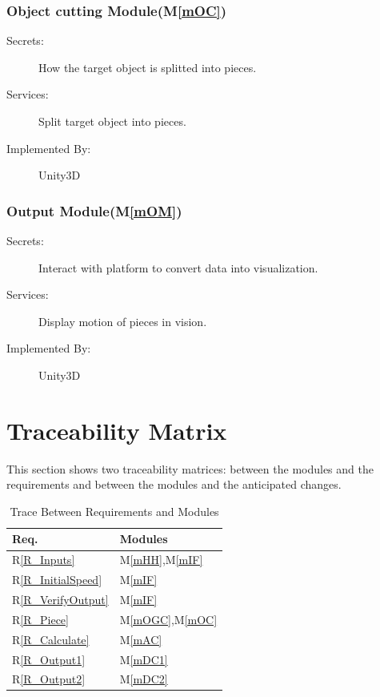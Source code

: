 \documentclass[12pt, titlepage]{article}
\newcommand{\rref}[1]{R\ref{#1}}
\newcommand{\mref}[1]{M\ref{#1}}
\begin{document}
	\subsubsection{Object cutting Module(\mref{mOC})}
	
	\begin{description}
		\item[Secrets:] How the target object is splitted into pieces.
		\item[Services:] Split target object into pieces.
		\item[Implemented By:] Unity3D
	\end{description}
	
	\subsubsection{Output Module(\mref{mOM})}
	
	\begin{description}
		\item[Secrets:] Interact with platform to convert data into visualization.
		\item[Services:] Display motion of pieces in vision.
		\item[Implemented By:] Unity3D
		\end{description}
	
	\section{Traceability Matrix} \label{SecTM}
	
	This section shows two traceability matrices: between the modules and the
	requirements and between the modules and the anticipated changes.
	
	\begin{table}[H]
		\centering
		\begin{tabular}{p{} p{}}
			\toprule
			\textbf{Req.} & \textbf{Modules}\\
			\midrule
			\rref{R_Inputs} & \mref{mHH},\mref{mIF}\\
			\rref{R_InitialSpeed} & \mref{mIF}\\
			\rref{R_VerifyOutput} & \mref{mIF}\\
			\rref{R_Piece} & \mref{mOGC},\mref{mOC}\\
			\rref{R_Calculate} & \mref{mAC}\\
			\rref{R_Output1} & \mref{mDC1}\\
			\rref{R_Output2} & \mref{mDC2}\\
			\bottomrule
		\end{tabular}
		\caption{Trace Between Requirements and Modules}
		\label{TblRT}
	\end{table}
	
\end{document}
